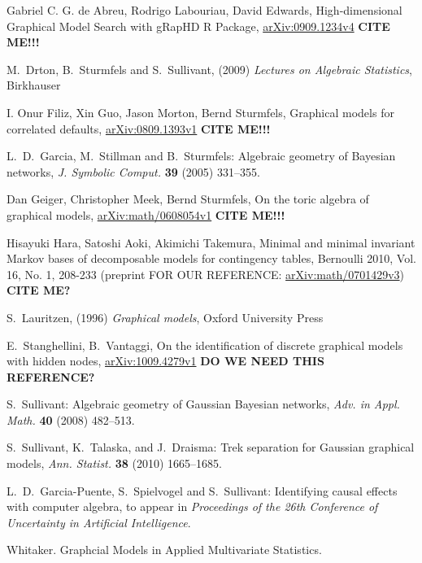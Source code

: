 \documentclass{article}
\theoremstyle{definition}
\begin{document}
\begin{thebibliography}{20}

Gabriel C. G. de Abreu, Rodrigo Labouriau, David Edwards, High-dimensional Graphical Model Search with gRapHD R Package, \href{http://arxiv.org/abs/0909.1234}{arXiv:0909.1234v4}
{\bf CITE ME!!!}

M.~Drton, B.~Sturmfels and S.~Sullivant, (2009) \emph{Lectures on Algebraic Statistics}, Birkhauser 

I. Onur Filiz, Xin Guo, Jason Morton, Bernd Sturmfels, Graphical models for correlated defaults, \href{http://arxiv.org/abs/0809.1393}{arXiv:0809.1393v1}
{\bf CITE ME!!!}

 L.~D.~Garcia, M.~Stillman and B.~Sturmfels: Algebraic geometry of Bayesian networks, {\em J. Symbolic Comput.}
  {\bf 39} (2005) 331--355.
  
Dan Geiger, Christopher Meek, Bernd Sturmfels, On the toric algebra of graphical models, \href{http://arxiv.org/abs/math/0608054}{arXiv:math/0608054v1}
{\bf CITE ME!!!}

Hisayuki Hara, Satoshi Aoki, Akimichi Takemura, Minimal and minimal invariant Markov bases of decomposable models for contingency tables, Bernoulli 2010, Vol. 16, No. 1, 208-233  (preprint FOR OUR REFERENCE: \href{http://arxiv.org/abs/math/0701429}{arXiv:math/0701429v3})
{\bf CITE ME?}

S.~Lauritzen,  (1996) \emph{Graphical models}, Oxford University Press

E.~Stanghellini, B.~Vantaggi, On the identification of discrete graphical models with hidden nodes, \href{http://arxiv.org/abs/1009.4279}{	arXiv:1009.4279v1}
{\bf DO WE NEED THIS REFERENCE?}

 S.~Sullivant: Algebraic geometry of Gaussian Bayesian
  networks, {\em Adv. in Appl. Math.} {\bf 40} (2008) 482--513.

S.~Sullivant, K.~Talaska, and J.~Draisma: Trek separation for Gaussian
graphical models, {\em Ann. Statist.} {\bf 38} (2010) 1665--1685. 

 L.~D.~Garcia-Puente, S.~Spielvogel and S.~Sullivant: Identifying
causal effects with computer algebra, to appear in {\em Proceedings of the 26th
Conference of Uncertainty in Artificial Intelligence}.

  Whitaker.  Graphcial Models in Applied Multivariate Statistics.

\end{thebibliography}
\end{document}
